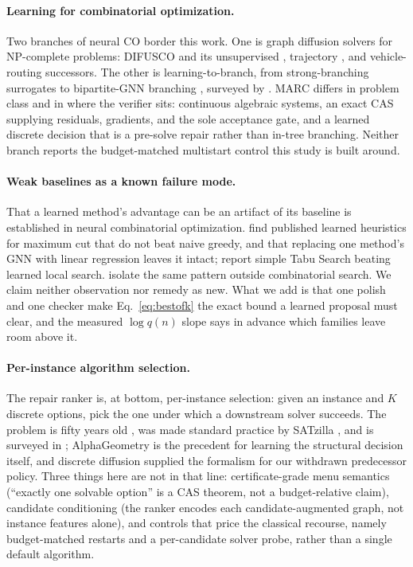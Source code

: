 \documentclass[letterpaper]{article} %
\begin{document}
\paragraph{Learning for combinatorial optimization.}
Two branches of neural CO border this work. One is graph diffusion solvers for NP-complete
problems: DIFUSCO \citep{sun2023difusco} and its unsupervised \citep{sanokowski2024diffuco},
trajectory \citep{li2024constraintaware}, and vehicle-routing \citep{anon2026vrpdiffusion}
successors. The other is learning-to-branch, from strong-branching surrogates \citep{khalil2016branch}
to bipartite-GNN branching \citep{gasse2019exact}, surveyed by \citet{bengio2021mlco}. MARC
differs in problem class and in where the verifier sits: continuous algebraic systems, an
exact CAS supplying residuals, gradients, and the sole acceptance gate, and a learned discrete
decision that is a pre-solve repair rather than in-tree branching. Neither branch reports the
budget-matched multistart control this study is built around.

\paragraph{Weak baselines as a known failure mode.}
That a learned method's advantage can be an artifact of its baseline is established in
neural combinatorial optimization. \citet{nath2024maxcutbenchmark} find published learned
heuristics for maximum cut that do not beat naive greedy, and that replacing one method's GNN
with linear regression leaves it intact; \citet{nath2023mightiest} report simple Tabu Search
beating learned local search. \citet{rodrigues2026budgetmatched} isolate the same pattern
outside combinatorial search. We claim neither observation nor remedy as new. What we add is that one polish and one
checker make Eq.~\eqref{eq:bestofk} the exact bound a learned proposal must clear, and the
measured $\log q(n)$ slope says in advance which families leave room above it.

\paragraph{Per-instance algorithm selection.}
The repair ranker is, at bottom, per-instance selection: given an
instance and $K$ discrete options, pick the one under which a downstream solver succeeds.
The problem is fifty years old \citep{rice1976algorithm}, was made standard practice by
SATzilla \citep{xu2008satzilla}, and is surveyed in \citet{kerschke2019survey}; AlphaGeometry
\citep{trinh2024alphageometry} is the precedent for learning
the structural decision itself, and discrete diffusion \citep{austin2021d3pm,
vignac2023digress} supplied the formalism for our withdrawn predecessor policy. Three things
here are not in that line: certificate-grade menu semantics (``exactly
one solvable option'' is a CAS theorem, not a budget-relative claim), candidate conditioning
(the ranker encodes each candidate-augmented graph, not instance features alone), and
controls that price the classical recourse, namely budget-matched restarts and a
per-candidate solver probe, rather than a single default algorithm.
\end{document}
